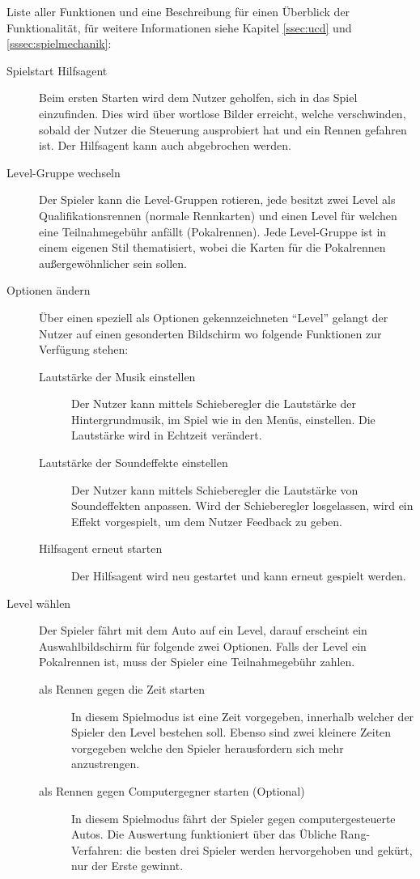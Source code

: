 	Liste aller Funktionen und eine Beschreibung für einen Überblick der Funktionalität, für weitere Informationen siehe Kapitel \ref{ssec:ucd} und \ref{sssec:spielmechanik}:
	\begin{description}
		\item[Spielstart Hilfsagent]{ Beim ersten Starten wird dem Nutzer geholfen, sich in das Spiel einzufinden. Dies wird über wortlose Bilder erreicht, welche verschwinden, sobald der Nutzer die Steuerung ausprobiert hat und ein Rennen gefahren ist. Der Hilfsagent kann auch abgebrochen werden. }
		\item[Level-Gruppe wechseln]{
			Der Spieler kann die Level-Gruppen rotieren, jede besitzt zwei Level als Qualifikationsrennen (normale Rennkarten) und einen Level für welchen eine Teilnahmegebühr anfällt (Pokalrennen).
			Jede Level-Gruppe ist in einem eigenen Stil thematisiert, wobei die Karten für die Pokalrennen außergewöhnlicher sein sollen.
		}
		\item[Optionen ändern]{ Über einen speziell als Optionen gekennzeichneten \enquote{Level} gelangt der Nutzer auf einen gesonderten Bildschirm wo folgende Funktionen zur Verfügung stehen:
			\begin{description}
				\item[Lautstärke der Musik einstellen]{ Der Nutzer kann mittels Schieberegler die Lautstärke der Hintergrundmusik, im Spiel wie in den Menüs, einstellen. Die Lautstärke wird in Echtzeit verändert. }
				\item[Lautstärke der Soundeffekte einstellen]{ Der Nutzer kann mittels Schieberegler die Lautstärke von Soundeffekten anpassen. Wird der Schieberegler losgelassen, wird ein Effekt vorgespielt, um dem Nutzer Feedback zu geben.}
				\item[Hilfsagent erneut starten]{ Der Hilfsagent wird neu gestartet und kann erneut gespielt werden.}
			\end{description}
		}
		\item[Level wählen]{ Der Spieler fährt mit dem Auto auf ein Level, darauf erscheint ein Auswahlbildschirm für folgende zwei Optionen. Falls der Level ein Pokalrennen ist, muss der Spieler eine Teilnahmegebühr zahlen.
			\begin{description}
				\item[als Rennen gegen die Zeit starten]{ In diesem Spielmodus ist eine Zeit vorgegeben, innerhalb welcher der Spieler den Level bestehen soll. Ebenso sind zwei kleinere Zeiten vorgegeben welche den Spieler herausfordern sich mehr anzustrengen. }
				\item[als Rennen gegen Computergegner starten (Optional)]{ In diesem Spielmodus fährt der Spieler gegen computergesteuerte Autos. Die Auswertung funktioniert über das Übliche Rang-Verfahren: die besten drei Spieler werden hervorgehoben und gekürt, nur der Erste gewinnt.}

\end{description}}
\end{description}

